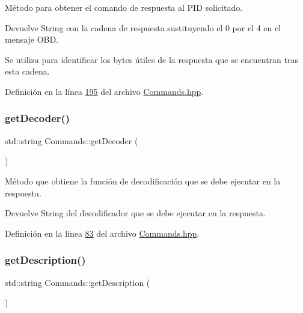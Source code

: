 Método para obtener el comando de respuesta al P\+ID solicitado. 

\begin{DoxyReturn}{Devuelve}
String con la cadena de respuesta sustituyendo el 0 por el 4 en el mensaje O\+BD.
\end{DoxyReturn}
Se utiliza para identificar los bytes útiles de la respuesta que se encuentran tras esta cadena. 

Definición en la línea \hyperlink{Commands_8hpp_source_l00195}{195} del archivo \hyperlink{Commands_8hpp_source}{Commands.\+hpp}.

\mbox{\label{classCommands_a8b4c2a655d8dd3de334338d6684d469c}} 
\subsubsection{\texorpdfstring{get\+Decoder()}{getDecoder()}}
{\footnotesize\ttfamily std\+::string Commands\+::get\+Decoder (\begin{DoxyParamCaption}{ }\end{DoxyParamCaption})\hspace{0.3cm}{\ttfamily [inline]}}



Método que obtiene la función de decodificación que se debe ejecutar en la respuesta. 

\begin{DoxyReturn}{Devuelve}
String del decodificador que se debe ejecutar en la respuesta. 
\end{DoxyReturn}


Definición en la línea \hyperlink{Commands_8hpp_source_l00083}{83} del archivo \hyperlink{Commands_8hpp_source}{Commands.\+hpp}.

\mbox{\label{classCommands_ad82fe7dfcf1908423bdb59d048020e26}} 
\subsubsection{\texorpdfstring{get\+Description()}{getDescription()}}
{\footnotesize\ttfamily std\+::string Commands\+::get\+Description (\begin{DoxyParamCaption}{ }\end{DoxyParamCaption})\hspace{0.3cm}{\ttfamily [inline]}}



